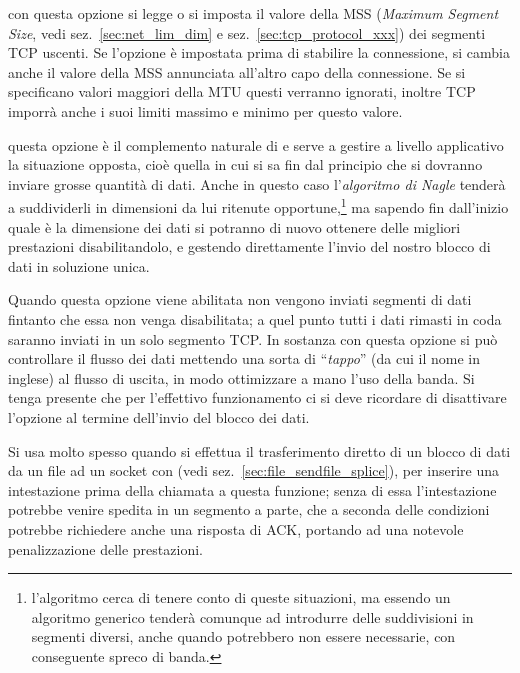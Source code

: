 \begin{basedescript}{\desclabelwidth{1.5cm}\desclabelstyle{\nextlinelabel}}
\item[\constd{TCP\_MAXSEG}] con questa opzione si legge o si imposta il valore
  della MSS (\textit{Maximum Segment Size}, vedi sez.~\ref{sec:net_lim_dim} e
  sez.~\ref{sec:tcp_protocol_xxx}) dei segmenti TCP uscenti. Se l'opzione è
  impostata prima di stabilire la connessione, si cambia anche il valore della
  MSS annunciata all'altro capo della connessione. Se si specificano valori
  maggiori della MTU questi verranno ignorati, inoltre TCP imporrà anche i
  suoi limiti massimo e minimo per questo valore.

\item[\constd{TCP\_CORK}] questa opzione è il complemento naturale di
   e serve a gestire a livello applicativo la situazione
  opposta, cioè quella in cui si sa fin dal principio che si dovranno inviare
  grosse quantità di dati. Anche in questo caso l'\textsl{algoritmo di Nagle}
  tenderà a suddividerli in dimensioni da lui ritenute
  opportune,\footnote{l'algoritmo cerca di tenere conto di queste situazioni,
    ma essendo un algoritmo generico tenderà comunque ad introdurre delle
    suddivisioni in segmenti diversi, anche quando potrebbero non essere
    necessarie, con conseguente spreco di banda.}  ma sapendo fin dall'inizio
  quale è la dimensione dei dati si potranno di nuovo ottenere delle migliori
  prestazioni disabilitandolo, e gestendo direttamente l'invio del nostro
  blocco di dati in soluzione unica.

  Quando questa opzione viene abilitata non vengono inviati segmenti di dati
  fintanto che essa non venga disabilitata; a quel punto tutti i dati rimasti
  in coda saranno inviati in un solo segmento TCP. In sostanza con questa
  opzione si può controllare il flusso dei dati mettendo una sorta di
  ``\textsl{tappo}'' (da cui il nome in inglese) al flusso di uscita, in modo
  ottimizzare a mano l'uso della banda. Si tenga presente che per l'effettivo
  funzionamento ci si deve ricordare di disattivare l'opzione al termine
  dell'invio del blocco dei dati.

  Si usa molto spesso  quando si effettua il trasferimento
  diretto di un blocco di dati da un file ad un socket con 
  (vedi sez.~\ref{sec:file_sendfile_splice}), per inserire una intestazione
  prima della chiamata a questa funzione; senza di essa l'intestazione
  potrebbe venire spedita in un segmento a parte, che a seconda delle
  condizioni potrebbe richiedere anche una risposta di ACK, portando ad una
  notevole penalizzazione delle prestazioni.


\end{basedescript}
